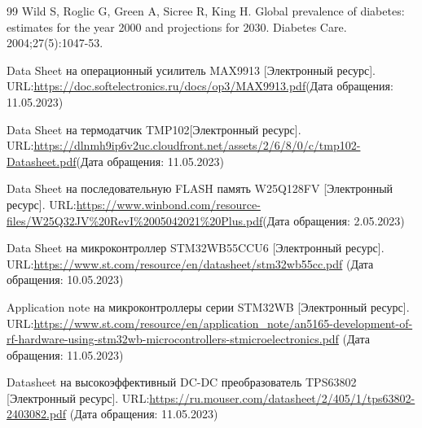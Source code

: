 \newpage
\renewcommand\refname{\centering СПИСОК ИСПОЛЬЗОВАННЫХ ИСТОЧНИКОВ}
\begin {thebibliography} {99}
Wild S, Roglic G, Green A, Sicree R, King H. Global prevalence of diabetes: estimates for the year 2000 and projections for 2030. Diabetes Care. 2004;27(5):1047-53.






Data Sheet на операционный усилитель MAX9913 [Электронный ресурс]. URL:\href{https://doc.softelectronics.ru/docs/op3/MAX9913.pdf}{https://doc.softelectronics.ru/docs/op3/MAX9913.pdf}(Дата обращения: 11.05.2023)

Data Sheet на термодатчик TMP102[Электронный ресурс]. URL:\href{https://dlnmh9ip6v2uc.cloudfront.net/assets/2/6/8/0/c/tmp102-Datasheet.pdf}{https://dlnmh9ip6v2uc.cloudfront.net/assets/2/6/8/0/c/tmp102-Datasheet.pdf}(Дата обращения: 11.05.2023)


Data Sheet на последовательную FLASH память W25Q128FV [Электронный ресурс]. URL:\href{https://www.winbond.com/resource-files/W25Q32JV\%20RevI\%2005042021\%20Plus.pdf}{https://www.winbond.com/resource-files/W25Q32JV\%20RevI\%2005042021\%20Plus.pdf}(Дата обращения: 2.05.2023)





Data Sheet на микроконтроллер STM32WB55CCU6  [Электронный ресурс]. URL:\href{https://www.st.com/resource/en/datasheet/stm32wb55cc.pdf}{https://www.st.com/resource/en/datasheet/stm32wb55cc.pdf} (Дата обращения: 10.05.2023)


Application note на микроконтроллеры серии STM32WB  [Электронный ресурс]. URL:\href{https://www.st.com/resource/en/application_note/an5165-development-of-rf-hardware-using-stm32wb-microcontrollers-stmicroelectronics.pdf}{https://www.st.com/resource/en/application\_note/an5165-development-of-rf-hardware-using-stm32wb-microcontrollers-stmicroelectronics.pdf} (Дата обращения: 11.05.2023)





Datasheet на высокоэффективный DC-DC преобразователь TPS63802 [Электронный ресурс]. URL:\href{https://ru.mouser.com/datasheet/2/405/1/tps63802-2403082.pdf}{https://ru.mouser.com/datasheet/2/405/1/tps63802-2403082.pdf} (Дата обращения: 11.05.2023)











\end {thebibliography}




